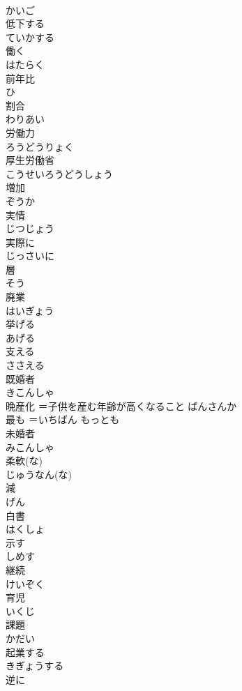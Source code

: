 \documentclass[8pt]{extreport}
\begin{document}
\begin{CJK}{UTF8}{min}
\\	かいご
\\	低下する	
\\	ていかする
\\	働く	
\\	はたらく
\\	前年比	
\\	ひ
\\	割合	
\\	わりあい
\\	労働力	
\\	ろうどうりょく
\\	厚生労働省	
\\	こうせいろうどうしょう
\\	増加	
\\	ぞうか
\\	実情	
\\	じつじょう
\\	実際に	
\\	じっさいに
\\	層	
\\	そう
\\	廃業	
\\	はいぎょう
\\	挙げる	
\\	あげる
\\	支える	
\\	ささえる
\\	既婚者	
\\	きこんしゃ
\\	晩産化	＝子供を産む年齢が高くなること	ばんさんか
\\	最も	＝いちばん	もっとも
\\	未婚者	
\\	みこんしゃ
\\	柔軟(な)	
\\	じゅうなん(な)
\\	減	
\\	げん
\\	白書	
\\	はくしょ
\\	示す	
\\	しめす
\\	継続	
\\	けいぞく
\\	育児	
\\	いくじ
\\	課題	
\\	かだい
\\	起業する	
\\	きぎょうする
\\	逆に	

\end{CJK}
\end{document}
